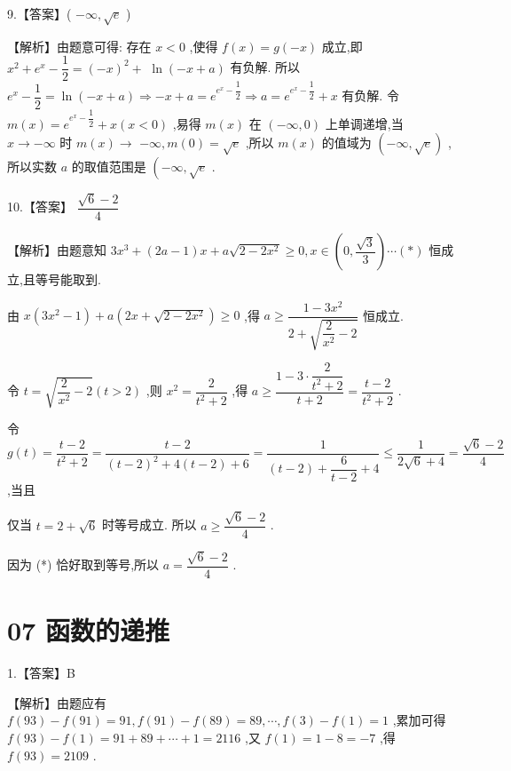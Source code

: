 \documentclass[10pt]{article}
\begin{document}
9.【答案】( $- \infty ,\sqrt{{e}}$ )

【解析】由题意可得: 存在 $x < 0$ ,使得 $f\left( x\right)  = g\left( {-x}\right)$ 成立,即 ${x}^{2} + {{e}}^{x} - \dfrac{1}{2} = {\left( -x\right) }^{2} +$  $\ln \left( {-x + a}\right)$ 有负解. 所以 ${{e}}^{x} - \dfrac{1}{2} = \ln \left( {-x + a}\right)  \Rightarrow   - x + a = {{e}}^{{{e}}^{x} - \dfrac{1}{2}} \Rightarrow  a = {{e}}^{{{e}}^{x} - \dfrac{1}{2}} + x$ 有负解. 令 $m\left( x\right)  = {{e}}^{{{e}}^{x} - \dfrac{1}{2}} + x\left( {x < 0}\right)$ ,易得 $m\left( x\right)$ 在 $\left( {-\infty ,0}\right)$ 上单调递增,当 $x \rightarrow   - \infty$ 时 $m\left( x\right)  \rightarrow$  $- \infty ,m\left( 0\right)  = \sqrt{{e}}$ ,所以 $m\left( x\right)$ 的值域为 $\left( {-\infty ,\sqrt{{e}}}\right)$ ,所以实数 $a$ 的取值范围是 $\left( {-\infty ,\sqrt{{e}}}\right.$ .

10.【答案】 $\dfrac{\sqrt{6} - 2}{4}$

【解析】由题意知 $3{x}^{3} + \left( {{2a} - 1}\right) x + a\sqrt{2 - 2{x}^{2}} \geq  0,x \in  \left( {0,\dfrac{\sqrt{3}}{3}}\right) \cdots \left( *\right)$ 恒成立,且等号能取到.

由 $x\left( {3{x}^{2} - 1}\right)  + a\left( {{2x} + \sqrt{2 - 2{x}^{2}}}\right)  \geq  0$ ,得 $a \geq  \dfrac{1 - 3{x}^{2}}{2 + \sqrt{\dfrac{2}{{x}^{2}} - 2}}$ 恒成立.

令 $t = \sqrt{\dfrac{2}{{x}^{2}} - 2}\left( {t > 2}\right)$ ,则 ${x}^{2} = \dfrac{2}{{t}^{2} + 2}$ ,得 $a \geq  \dfrac{1 - 3 \cdot  \dfrac{2}{{t}^{2} + 2}}{t + 2} = \dfrac{t - 2}{{t}^{2} + 2}$ .

令 $g\left( t\right)  = \dfrac{t - 2}{{t}^{2} + 2} = \dfrac{t - 2}{{\left( t - 2\right) }^{2} + 4\left( {t - 2}\right)  + 6} = \dfrac{1}{\left( {t - 2}\right)  + \dfrac{6}{t - 2} + 4} \leq  \dfrac{1}{2\sqrt{6} + 4} = \dfrac{\sqrt{6} - 2}{4}$ ,当且

仅当 $t = 2 + \sqrt{6}$ 时等号成立. 所以 $a \geq  \dfrac{\sqrt{6} - 2}{4}$ .

因为 (*) 恰好取到等号,所以 $a = \dfrac{\sqrt{6} - 2}{4}$ .

\section*{07 函数的递推}

1.【答案】B

【解析】由题应有 $f\left( {93}\right)  - f\left( {91}\right)  = {91},f\left( {91}\right)  - f\left( {89}\right)  = {89},\cdots ,f\left( 3\right)  - f\left( 1\right)  = 1$ ,累加可得 $f\left( {93}\right)  - f\left( 1\right)  = {91} + {89} + \cdots  + 1 = {2116}$ ,又 $f\left( 1\right)  = 1 - 8 =  - 7$ ,得 $f\left( {93}\right)  = {2109}$ .
\end{document}
